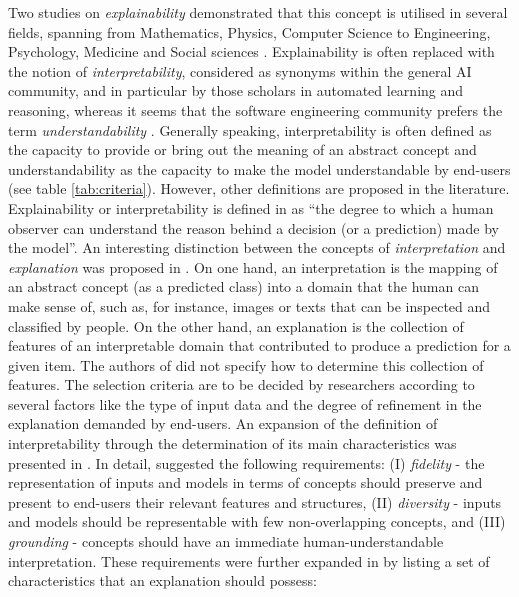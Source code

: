 \documentclass[final,1p,times]{elsarticle}
\begin{document}
Two studies on \textit{explainability} demonstrated that this concept is utilised in several fields, spanning from Mathematics, Physics, Computer Science to Engineering, Psychology, Medicine and Social sciences \cite{alonso2018bibliometric, abdul2018trends}. Explainability is often replaced with the notion of \textit{interpretability}, considered as synonyms within the general AI community, and in particular by those scholars in automated learning and reasoning, whereas it seems that the software engineering community prefers the term \textit{understandability} \cite{alonso2018bibliometric}. Generally speaking, interpretability is often defined as the capacity to provide or bring out the meaning of an abstract concept and understandability as the capacity to make the model understandable by end-users (see table \ref{tab:criteria}). However, other definitions are proposed in the literature. Explainability or interpretability is defined in \cite{dam2018explainable} as ``the degree to which a human observer can understand the reason behind a decision (or a prediction) made by the model''. An interesting distinction between the concepts of \textit{interpretation} and \textit{explanation} was proposed in \cite{montavon2017methods}. On one hand, an interpretation is the mapping of an abstract concept (as a predicted class) into a domain that the human can make sense of, such as, for instance, images or texts that can be inspected and classified by people. On the other hand, an explanation is the collection of features of an interpretable domain that contributed to produce a prediction for a given item. The authors of \cite{montavon2017methods} did not specify how to determine this collection of features. The selection criteria are to be decided by researchers according to several factors like the type of input data and the degree of refinement in the explanation demanded by end-users. 
An expansion of the definition of interpretability through the determination of its main characteristics was presented in \cite{melis2018towards,miller2017explanation, sundararajan2019exploring}. In detail, \cite{melis2018towards} suggested the following requirements: (I) \textit{fidelity} - the representation of inputs and models in terms of concepts should preserve and present to end-users their relevant features and structures, (II) \textit{diversity} - inputs and models should be representable with few non-overlapping concepts, and (III) \textit{grounding} - concepts should have an immediate human-understandable interpretation.
These requirements were further expanded in \cite{miller2017explanation} by listing a set of characteristics that an explanation should possess:
\end{document}

